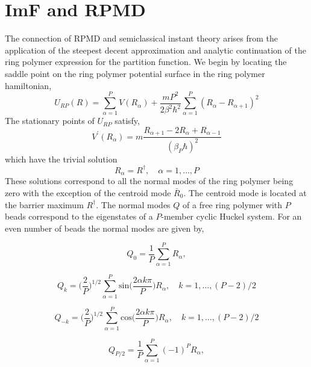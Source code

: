 \documentclass[phd,tocprelim]{cornell}
\begin{document}
\section{ImF and RPMD}
The connection of RPMD and semiclassical instant theory arises from the application of the steepest decent approximation and analytic continuation of the ring polymer expression for the partition function. We begin by locating the saddle point on the ring polymer potential surface in the ring polymer hamiltonian, 
\begin{equation}
U_{RP}(R) =  \sum_{\alpha=1}^P V(R_{\alpha}) + \frac{mP^2}{2\beta^2\hbar^2}\sum_{\alpha=1}^P (R_{\alpha} -R_{\alpha+1})^2
\end{equation}
The stationary points of $U_{RP}$ satisfy,
\begin{equation}
V^{'}(R_{\alpha}) = m\frac{R_{\alpha+1} - 2 R_{\alpha} + R_{\alpha-1}}{(\beta_P \hbar)^2}
\end{equation}
which have the trivial solution 
\begin{equation}
R_{\alpha} = R^{\dagger}, \quad \alpha =  1, \dots , P
\end{equation}
These solutions correspond to all the normal modes of the ring polymer being zero with the exception of the centroid mode $\bar{R}_0$. The centroid mode is located at the barrier maximum $R^{\dagger}$. The normal modes $Q$ of a free ring polymer with $P$ beads correspond to the eigenstates of a $P$-member cyclic Huckel system. For an even number of beads the normal modes are given by, 

\begin{equation}
Q_0 = \frac{1}{P} \sum_{\alpha=1}^P R_{\alpha},
\end{equation}

\begin{equation}
Q_k = \bigg(\frac{2}{P} \bigg)^{1/2} \sum_{\alpha=1}^P \textrm{sin}\bigg( \frac{2\alpha k \pi}{P} \bigg)R_{\alpha}, \quad k =1,\dots, (P-2)/2
\end{equation}

\begin{equation}
Q_{-k} = \bigg(\frac{2}{P} \bigg)^{1/2} \sum_{\alpha=1}^P \textrm{cos}\bigg( \frac{2\alpha k \pi}{P}\bigg)R_{\alpha}, \quad k =1,\dots, (P-2)/2
\end{equation}

\begin{equation}
Q_{P/2} = \frac{1}{P} \sum_{\alpha=1}^P (-1)^P R_{\alpha},
\end{equation}
\end{document}
